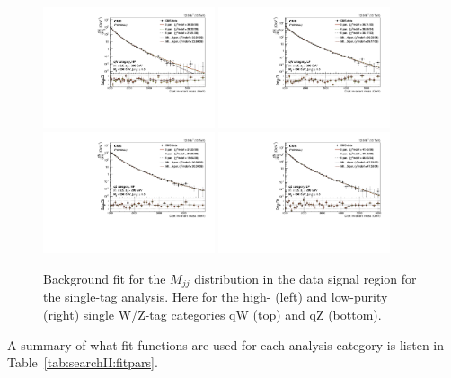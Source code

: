 \begin{figure}[h!]
\centering
\includegraphics[width=0.45\textwidth]{figures/analysis/search2/AN-16-235/plots/qWHP.pdf}
\includegraphics[width=0.45\textwidth]{figures/analysis/search2/AN-16-235/plots/qWLP.pdf}\\
\includegraphics[width=0.45\textwidth]{figures/analysis/search2/AN-16-235/plots/qZHP.pdf}
\includegraphics[width=0.45\textwidth]{figures/analysis/search2/AN-16-235/plots/qZLP.pdf}\\
\caption{Background fit for the $M_{jj}$ distribution in the data signal region for the single-tag analysis. Here for the high- (left) and low-purity (right) single W/Z-tag categories qW (top) and qZ (bottom).}
\label{fig:searchII:bkgfit_sr_qv}
\end{figure}
A summary of what fit functions are used for each analysis category is listen in Table~\ref{tab:searchII:fitpars}.
